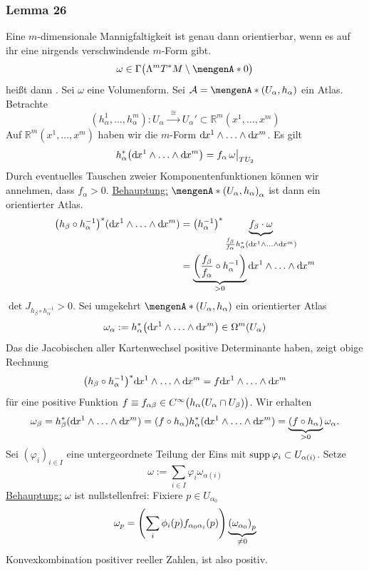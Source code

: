 \subsubsection{Lemma 26} %
\label{ssub:543}
Eine $m$-dimensionale Mannigfaltigkeit ist genau dann orientierbar, wenn es auf ihr eine nirgends verschwindende $m$-Form gibt.
\[
	\omega \in \Gamma \enbrace[\big]{\Lambda^m T^* M \setminus \set{0} } 
\]
heißt dann . 
Sei $\omega$ eine Volumenform. Sei $\mathcal{A} = \set{(U_\alpha, h_\alpha)}$ ein Atlas. Betrachte
\[
	(h_\alpha^1, \ldots , h_\alpha^m) : U_\alpha \xrightarrow{\enspace\cong \enspace} U_\alpha' \subset \mathds{R}^m(x^1, \ldots , x^m) 
\]
Auf $\mathds{R}^m(x^1, \ldots , x^m)$ haben wir die $m$-Form $\mathd x^1 \wedge \ldots \wedge \mathd x^m$. Es gilt
\begin{align*}
	h_\alpha^* \enbrace*{\mathd x^1 \wedge \ldots \wedge \mathd x^m} = f_\alpha \,\omega\big|_{TU_2} 
\end{align*}
Durch eventuelles Tauschen zweier Komponentenfunktionen können wir annehmen, dass $f_\alpha >0$. \uline{Behauptung:} $\set{(U_\alpha, h_\alpha)}_\alpha$ ist dann ein 
orientierter Atlas.
\begin{align*}
	\enbrace*{h_\beta \circ h_\alpha ^{-1}}^* (\mathd x^1 \wedge \ldots \wedge \mathd x^m) &= \enbrace*{h_\alpha ^{-1}}^* \underbrace{f_\beta \cdot \omega  }_{\frac{f_\beta}{f_\alpha} h_\alpha^* (\mathd x^1 \wedge \ldots \wedge \mathd x^m) } \\
	&= \underbrace{\enbrace*{\frac{f_\beta}{f_\alpha} \circ h_\alpha ^{-1} }}_{>0} \mathd x^1 \wedge \ldots \wedge \mathd x^m 
\end{align*}
$\det J_{h_\beta \circ h_\alpha ^{-1}} >0$. Sei umgekehrt $\set{(U_\alpha, h_\alpha)}$ ein orientierter Atlas
\[
	\omega_\alpha := h_\alpha^* \enbrace*{\mathd x^1 \wedge \ldots \wedge \mathd x^m} \in \Omega^m(U_\alpha) 
\]
Das die Jacobischen aller Kartenwechsel positive Determinante haben, zeigt obige Rechnung 
\[
	\enbrace*{h_\beta \circ h_\alpha ^{-1}}^* \mathd x^1 \wedge \ldots \wedge \mathd x^m = f  \mathd x^1 \wedge \ldots \wedge \mathd x^m
\]
für eine positive Funktion $f \equiv f_{\alpha \beta} \in C^\infty \enbrace[\big]{h_\alpha(U_\alpha \cap U_\beta)}$. Wir erhalten
\begin{align*}
	\omega_\beta = h_\beta^*(\mathd x^1 \wedge \ldots \wedge \mathd x^m) = (f \circ h_\alpha) h_\alpha^* (\mathd x^1 \wedge \ldots \wedge \mathd x^m) 
	= \underbrace{\enbrace*{f \circ h_\alpha} }_{>0} \omega_\alpha.
\end{align*}
Sei $(\varphi_i)_{i \in I}$ eine untergeordnete Teilung der Eins mit $\supp \varphi_i \subset U_{\alpha(i)}$. Setze
\[
	\omega := \sum_{i \in I} \varphi_i \omega_{\alpha(i)}
\]
\uline{Behauptung:} $\omega$ ist nullstellenfrei: Fixiere $p \in U_{\alpha_0}$
\begin{align*}
	\omega_p = \enbrace*{\sum_i \phi_i(p) f_{\alpha_0 \alpha_i} (p) }\underbrace{\enbrace*{\omega_{\alpha_0}}_p }_{\not= 0}
\end{align*}
Konvexkombination positiver reeller Zahlen, ist also positiv. \bewende

